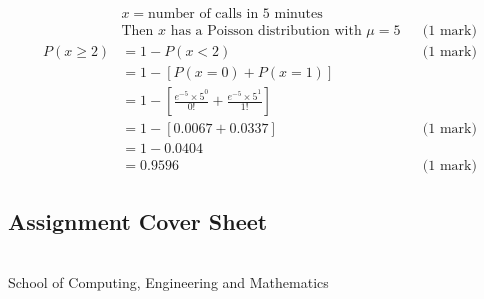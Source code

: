 \documentclass[a4paper,oneside]{book}
\begin{document}
\begin{enumerate}
\begin{align*}
  & x = \text{number of calls in 5 minutes} \\
  & \text{Then $x$ has a Poisson distribution with } \mu = 5 && \text{(1 mark)} \\
  P(x \ge 2) &= 1 - P(x < 2) && \text{(1 mark)} \\
  &= 1 - [P(x = 0) + P(x = 1)] \\
  &= 1 - \left [ \frac{e^{-5}\times 5^0}{0!} + \frac{e^{-5}\times
      5^1}{1!}\right ] \\
  &= 1 - [0.0067 + 0.0337] && \text{(1 mark)} \\
  &= 1 - 0.0404 \\
  &= 0.9596 && \text{(1 mark)}
\end{align*}
\end{enumerate}



\newpage


\subsection*{Assignment Cover Sheet}

\begin{flushright}
 \\[1em]
School of Computing, Engineering and Mathematics \\
\end{flushright}
\end{document}
